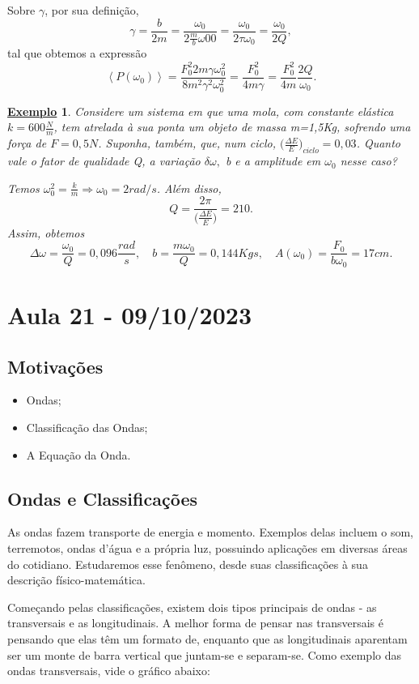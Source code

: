 \documentclass{article}
\newtheorem{example}{\underline{Exemplo}}
\begin{document}
Sobre \(\gamma \), por sua definição, 
\[
  \gamma = \frac{b}{2m} = \frac{\omega_{0}}{2\frac{m}{b}\omega 00} = \frac{\omega_{0}}{2\tau \omega_{0}} = \frac{\omega_{0}}{2Q},
\]
tal que obtemos a expressão
\[
  \left< P(\omega_{0}) \right> = \frac{F_{0}^{2}2m\gamma \omega_{0}^{2}}{8m^{2}\gamma^{2}\omega_{0}^{2}} = \frac{F_{0}^{2}}{4m\gamma } = \frac{F_{0}^{2}}{4m}\frac{2Q}{\omega_{0}}.
\]
\begin{example}
  Considere um sistema em que uma mola, com constante elástica \(k = 600 \frac{N}{m}\), tem atrelada à sua ponta um objeto de massa m=1,5Kg, sofrendo uma força de
  \(F=0,5N\). Suponha, também, que, num ciclo, \(\biggl(\frac{\Delta E}{E}\biggr)_{ciclo}=0,03\). Quanto vale o fator de qualidade Q, a variação \(\delta \omega ,\) b e a amplitude em \(\omega_{0}\) nesse caso?

  Temos \(\omega_{0}^{2} = \frac{k}{m} \Rightarrow \omega_{0} = 2rad/s\). Além disso, 
  \[
    Q = \frac{2\pi }{\biggl(\frac{\Delta E}{E}\biggr)} = 210.      
  \]
  Assim, obtemos 
  \[
    \Delta \omega  = \frac{\omega_{0}}{Q} = 0,096\frac{rad}{s},\quad b = \frac{m\omega_{0}}{Q} = 0,144 Kg\dot{}s,\quad A(\omega_{0}) = \frac{F_{0}}{b\omega_{0}} =17cm.
  \]
\end{example}
\newpage

\section{Aula 21 - 09/10/2023} 
\subsection{Motivações}
\begin{itemize}
  \item Ondas;
  \item Classificação das Ondas;
  \item A Equação da Onda.
\end{itemize}
\subsection{Ondas e Classificações}
As ondas fazem transporte de energia e momento. Exemplos delas incluem o som, terremotos,
ondas d'água e a própria luz, possuindo aplicações em diversas áreas do cotidiano. Estudaremos
esse fenômeno, desde suas classificações à sua descrição físico-matemática.

Começando pelas classificações, existem dois tipos principais de ondas - as transversais e as longitudinais.
A melhor forma de pensar nas transversais é pensando que elas têm um formato de, enquanto que as longitudinais
aparentam ser um monte de barra vertical que juntam-se e separam-se. Como exemplo
das ondas transversais, vide o gráfico abaixo:
\end{document}
